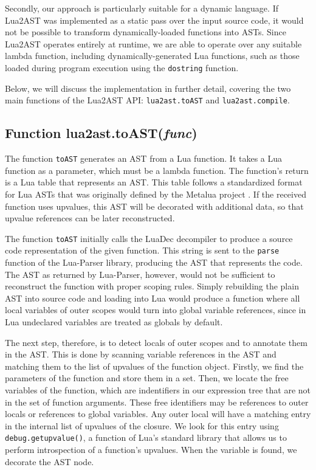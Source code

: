 \documentclass[english]{llncs}
\begin{document}
Secondly, our approach is particularly suitable for a dynamic language.
If Lua2AST was implemented as a static pass over the input source code,
it would not be possible to transform dynamically-loaded functions into ASTs.
Since Lua2AST operates entirely at runtime, we are able to operate over
any suitable lambda function, including dynamically-generated Lua functions,
such as those loaded during program execution using the \texttt{dostring} function.

Below, we will discuss the implementation in further detail, covering the two main functions
of the Lua2AST API: \texttt{lua2ast.toAST} and \texttt{lua2ast.compile}.

\subsection{Function lua2ast.toAST(\emph{func})}

The function \texttt{toAST} generates an AST from a Lua function.
It takes a Lua function as a parameter, which must be a lambda function.
The function's return is a Lua table that represents an AST.
This table follows a standardized format for Lua ASTs that was originally defined by the Metalua project \cite{metalua}.
If the received function uses upvalues, this AST will be decorated with additional data, so that upvalue references
can be later reconstructed.

The function \texttt{toAST} initially calls the LuaDec decompiler to produce a source code representation of the given function.
This string is sent to the \texttt{parse} function of the Lua-Parser library, producing the AST that represents the code.
The AST as returned by Lua-Parser, however, would not be sufficient to reconstruct the function with proper scoping rules.
Simply rebuilding the plain AST into source code and loading into Lua would produce a function where all local variables
of outer scopes would turn into global variable references, since in Lua undeclared variables are treated as globals
by default.

The next step, therefore, is to detect locals of outer scopes and to annotate them in the AST.
This is done by scanning variable references in the AST and matching them to the list of upvalues
of the function object.
Firstly, we find the parameters of the function and store them in a set.
Then, we locate the free variables of the function, which are indentifiers in our expression tree that are not in the set of function arguments.
These free identifiers may be references to outer locals or references to global variables.
Any outer local will have a matching entry in the internal list of upvalues of the closure.
We look for this entry using \texttt{debug.getupvalue()}, a function of Lua's standard library
that allows us to perform introspection of a function's upvalues.
When the variable is found, we decorate the AST node.
\end{document}
